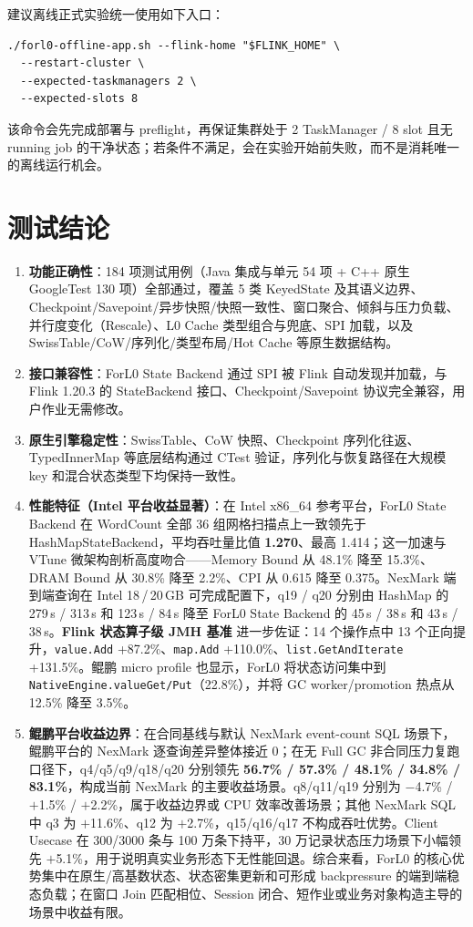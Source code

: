 \documentclass[a4paper,11pt]{article}
\newcommand{\project}{ForL0 State Backend}
\begin{document}
建议离线正式实验统一使用如下入口：

\begin{lstlisting}[language=shellcmd]
./forl0-offline-app.sh --flink-home "$FLINK_HOME" \
  --restart-cluster \
  --expected-taskmanagers 2 \
  --expected-slots 8
\end{lstlisting}

该命令会先完成部署与 preflight，再保证集群处于 2 TaskManager / 8 slot 且无 running job 的干净状态；若条件不满足，会在实验开始前失败，而不是消耗唯一的离线运行机会。

\section{测试结论}


\begin{enumerate}
  \item \textbf{功能正确性}：184 项测试用例（Java 集成与单元 54 项 + C++ 原生 GoogleTest 130 项）全部通过，覆盖 5 类 KeyedState 及其语义边界、Checkpoint/Savepoint/异步快照/快照一致性、窗口聚合、倾斜与压力负载、并行度变化（Rescale）、L0 Cache 类型组合与兜底、SPI 加载，以及 SwissTable/CoW/序列化/类型布局/Hot Cache 等原生数据结构。
  \item \textbf{接口兼容性}：\project{} 通过 SPI 被 Flink 自动发现并加载，与 Flink 1.20.3 的 StateBackend 接口、Checkpoint/Savepoint 协议完全兼容，用户作业无需修改。
  \item \textbf{原生引擎稳定性}：SwissTable、CoW 快照、Checkpoint 序列化往返、TypedInnerMap 等底层结构通过 CTest 验证，序列化与恢复路径在大规模 key 和混合状态类型下均保持一致性。
  \item \textbf{性能特征（Intel 平台收益显著）}：在 Intel x86\_64 参考平台，\project{} 在 WordCount 全部 36 组网格扫描点上一致领先于 HashMapStateBackend，平均吞吐量比值 \textbf{1.270}、最高 1.414；这一加速与 VTune 微架构剖析高度吻合——Memory Bound 从 48.1\% 降至 15.3\%、DRAM Bound 从 30.8\% 降至 2.2\%、CPI 从 0.615 降至 0.375。NexMark 端到端查询在 Intel 18\,/\,20\,GB 可完成配置下，q19 / q20 分别由 HashMap 的 279\,s / 313\,s 和 123\,s / 84\,s 降至 \project{} 的 45\,s / 38\,s 和 43\,s / 38\,s。\textbf{Flink 状态算子级 JMH 基准} 进一步佐证：14 个操作点中 13 个正向提升，\texttt{value.Add} +87.2\%、\texttt{map.Add} +110.0\%、\texttt{list.GetAndIterate} +131.5\%。鲲鹏 micro profile 也显示，ForL0 将状态访问集中到 \texttt{NativeEngine.valueGet/Put}（22.8\%），并将 GC worker/promotion 热点从 12.5\% 降至 3.5\%。
  \item \textbf{鲲鹏平台收益边界}：在合同基线与默认 NexMark event-count SQL 场景下，鲲鹏平台的 NexMark 逐查询差异整体接近 0；在无 Full GC 非合同压力复跑口径下，q4/q5/q9/q18/q20 分别领先 \textbf{56.7\% / 57.3\% / 48.1\% / 34.8\% / 83.1\%}，构成当前 NexMark 的主要收益场景。q8/q11/q19 分别为 $-$4.7\% / $+$1.5\% / $+$2.2\%，属于收益边界或 CPU 效率改善场景；其他 NexMark SQL 中 q3 为 $+$11.6\%、q12 为 $+$2.7\%，q15/q16/q17 不构成吞吐优势。Client Usecase 在 300/3000 条与 100 万条下持平，30 万记录状态压力场景下小幅领先 $+$5.1\%，用于说明真实业务形态下无性能回退。综合来看，ForL0 的核心优势集中在原生/高基数状态、状态密集更新和可形成 backpressure 的端到端稳态负载；在窗口 Join 匹配相位、Session 闭合、短作业或业务对象构造主导的场景中收益有限。

\end{enumerate}
\end{document}
